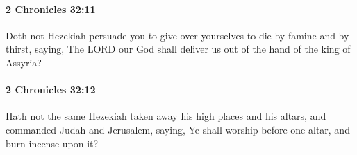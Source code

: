 		\paragraph{2 Chronicles 32:11} %
			\label{2CHRONICLES-32-11}

			Doth not Hezekiah persuade you to give over yourselves to die by famine and by thirst, saying, The LORD our God shall deliver us out of the hand of the king of Assyria?


		\paragraph{2 Chronicles 32:12} %
			\label{2CHRONICLES-32-12}

			Hath not the same Hezekiah taken away his high places and his altars, and commanded Judah and Jerusalem, saying, Ye shall worship before one altar, and burn incense upon it?

